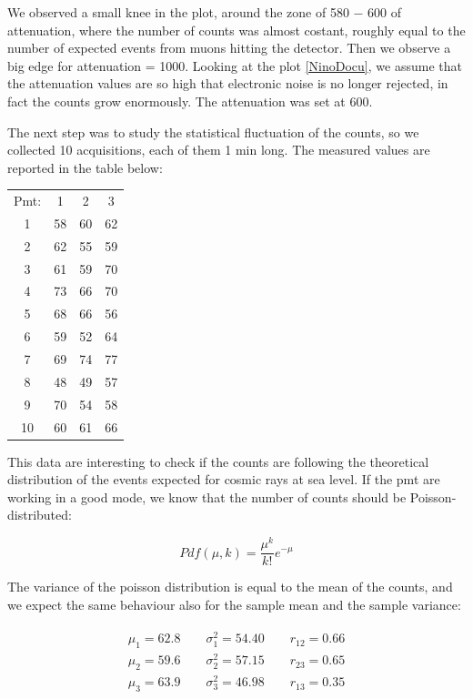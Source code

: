 We observed a small knee in the plot, around the zone of 580 − 600 of attenuation, where the number of counts was almost costant, roughly equal to the number of expected events from muons hitting the detector. Then we observe a big edge for attenuation = 1000. Looking at the plot \ref{NinoDocu}, we assume that the attenuation values are so high that electronic noise is no longer rejected, in fact the counts grow enormously. The attenuation was set at 600.

The next step was to study the statistical fluctuation of the counts, so we collected 10 acquisitions, each of them 1 min long. The measured values are reported in the table below:

\begin{center}
\begin{tabular}{|c|c|c|c|}
\hline 
Pmt: & 1 & 2 & 3 \\ 

1 & 58 & 60 & 62 \\ 
\hline 
2 & 62 & 55 & 59 \\ 
\hline 
3 & 61 & 59 & 70 \\ 
\hline 
4 & 73 & 66 & 70 \\ 
\hline 
5 & 68 & 66 & 56 \\ 
\hline 
6 & 59 & 52 & 64 \\ 
\hline 
7 & 69 & 74 & 77 \\ 
\hline 
8 & 48 & 49 & 57  \\ 
\hline 
9 & 70 & 54 & 58 \\ 
\hline 
10 & 60 & 61 & 66\\
\hline
\end{tabular} 
\end{center}

This data are interesting to check if the counts are following the theoretical distribution of the events expected for cosmic rays at sea level. If the pmt are working in a good mode, we know that the number of counts should be Poisson-distributed:

\begin{equation}
Pdf(\mu,k) =  \frac{\mu^{k}}{k!} e^{-\mu}
\end{equation}

The variance of the poisson distribution is equal to the mean of the counts, and we expect the same behaviour also for the sample mean and the sample variance:

\begin{align*}
\begin{split}
\mu_{1} = 62.8	\qquad \sigma^{2}_{1} = 54.40 \qquad r_{12} = 0.66\\
\mu_{2} = 59.6	\qquad \sigma^{2}_{2} = 57.15 \qquad r_{23} = 0.65\\
\mu_{3} = 63.9	\qquad \sigma^{2}_{3} = 46.98 \qquad r_{13} = 0.35 \\
\end{split}
\end{align*}

